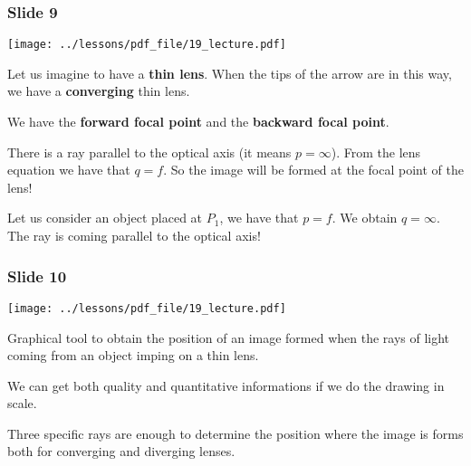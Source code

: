 \documentclass[../main/main.tex]{subfiles}
\begin{document}
\subsubsection*{Slide 9}

\begin{minipage}[]{0.5\linewidth}
\centering
\texttt{[image: ../lessons/pdf\_file/19\_lecture.pdf]}
\end{minipage}
\hspace{0.3cm}\vspace{0.3cm}
\begin{minipage}[c]{0.47\linewidth}

Let us imagine to have a \textbf{thin lens}. When the tips of the arrow are in this way, we have a \textbf{converging} thin lens.

We have the \textbf{forward focal point} and the \textbf{backward focal point}.

There is a ray parallel to the optical axis (it means \( p = \infty  \)). From the lens equation we have that \( q = f \). So the image will be formed at the focal point of the lens!

Let us consider an object placed at \( P_1 \), we have that \( p=f \). We obtain \( q = \infty  \). The ray is coming parallel to the optical axis!


\end{minipage}

\subsubsection*{Slide 10}

\begin{minipage}[]{0.5\linewidth}
\centering
\texttt{[image: ../lessons/pdf\_file/19\_lecture.pdf]}
\end{minipage}
\hspace{0.3cm}\vspace{0.3cm}
\begin{minipage}[c]{0.47\linewidth}

Graphical tool to obtain the position of an image formed when the rays of light coming from an object imping on a thin lens.

We can get both quality and quantitative informations if we do the drawing in scale.

Three specific rays are enough to determine the position where the image is forms both for converging and diverging lenses.


\end{minipage}
\end{document}
